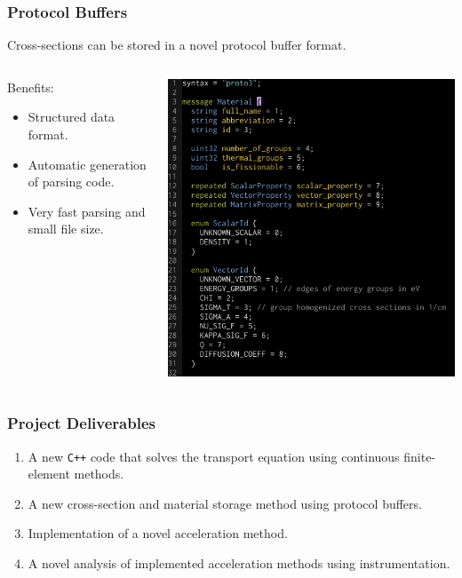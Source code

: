 \documentclass[xcolor=x11names, compress]{beamer}
\begin{document}
\begin{frame}
  \frametitle{Protocol Buffers}
  Cross-sections can be stored in a novel protocol buffer format.
  \begin{columns}
    \begin{column}{0.5\textwidth}
      Benefits:
  \begin{itemize}
  \item Structured data format.
  \item Automatic generation of parsing code.
  \item Very fast parsing and small file size.
  \end{itemize}
\end{column}
\begin{column}{0.5\textwidth}  %
    \begin{center}
     \includegraphics[width=\textwidth]{images/protocol_buffer}
     \end{center}
\end{column}
\end{columns}

  

    
\end{frame}

\begin{frame}
  \frametitle{Project Deliverables}

  \begin{enumerate}[<+->]
  \item A new \texttt{C++} code that solves the transport
    equation using continuous finite-element methods.
  \item A new cross-section and material storage method using protocol buffers.
  \item Implementation of a novel acceleration method.
  \item A novel analysis of implemented acceleration methods using
    instrumentation.
  \end{enumerate}
\end{frame}
\end{document}
